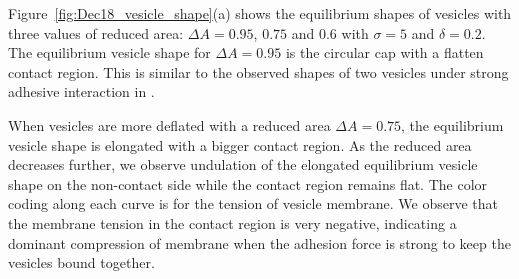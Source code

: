 \documentclass[%
preprint,
 amsmath,amssymb,
 aps,
]{revtex4-1}
\begin{document}
Figure~\ref{fig:Dec18_vesicle_shape}(a) shows the equilibrium shapes of vesicles with
three values of reduced area: $\Delta A=0.95$, $0.75$ and $0.6$ with $\sigma=5$ and $\delta = 0.2$.
The equilibrium vesicle shape for $\Delta A=0.95$ is the circular cap with a flatten contact region. 
This is similar to the observed shapes of two vesicles under strong adhesive interaction in \cite{RamachandranAndersonLealIsraelachvili2010_Langmuir}.

When vesicles are more deflated with a reduced area  $\Delta A = 0.75$, the equilibrium vesicle shape is elongated with a bigger contact region.
As the reduced area decreases further, we observe undulation of the elongated equilibrium vesicle shape on the non-contact side while the contact region remains flat. 
The color coding along each curve is for the tension of vesicle membrane.
We observe that the membrane tension in the contact region is very negative, indicating a dominant compression of membrane when the adhesion force is strong to keep the vesicles bound together.
\end{document}
